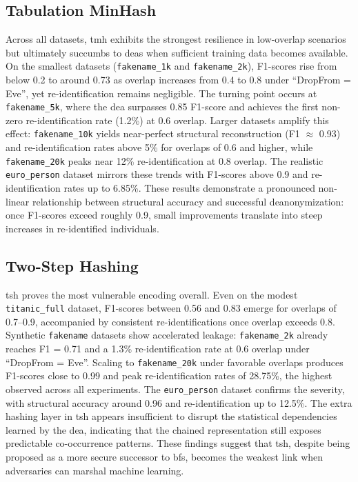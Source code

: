 \documentclass[a4paper,11pt]{scrartcl}
\begin{document}
\subsection{Tabulation MinHash}
Across all datasets, \ac{tmh} exhibits the strongest resilience in low-overlap scenarios but ultimately succumbs to \ac{dea}s when sufficient training data becomes available. On the smallest datasets (\texttt{fakename\_1k} and \texttt{fakename\_2k}), F1-scores rise from below 0.2 to around 0.73 as overlap increases from 0.4 to 0.8 under ``DropFrom = Eve'', yet re-identification remains negligible. The turning point occurs at \texttt{fakename\_5k}, where the \ac{dea} surpasses 0.85 F1-score and achieves the first non-zero re-identification rate (1.2\%) at 0.6 overlap. Larger datasets amplify this effect: \texttt{fakename\_10k} yields near-perfect structural reconstruction (F1 $\approx$ 0.93) and re-identification rates above 5\% for overlaps of 0.6 and higher, while \texttt{fakename\_20k} peaks near 12\% re-identification at 0.8 overlap. The realistic \texttt{euro\_person} dataset mirrors these trends with F1-scores above 0.9 and re-identification rates up to 6.85\%. These results demonstrate a pronounced non-linear relationship between structural accuracy and successful deanonymization: once F1-scores exceed roughly 0.9, small improvements translate into steep increases in re-identified individuals.

\subsection{Two-Step Hashing}
\ac{tsh} proves the most vulnerable encoding overall. Even on the modest \texttt{titanic\_full} dataset, F1-scores between 0.56 and 0.83 emerge for overlaps of 0.7--0.9, accompanied by consistent re-identifications once overlap exceeds 0.8. Synthetic \texttt{fakename} datasets show accelerated leakage: \texttt{fakename\_2k} already reaches F1 = 0.71 and a 1.3\% re-identification rate at 0.6 overlap under ``DropFrom = Eve''. Scaling to \texttt{fakename\_20k} under favorable overlaps produces F1-scores close to 0.99 and peak re-identification rates of 28.75\%, the highest observed across all experiments. The \texttt{euro\_person} dataset confirms the severity, with structural accuracy around 0.96 and re-identification up to 12.5\%. The extra hashing layer in \ac{tsh} appears insufficient to disrupt the statistical dependencies learned by the \ac{dea}, indicating that the chained representation still exposes predictable co-occurrence patterns. These findings suggest that \ac{tsh}, despite being proposed as a more secure successor to \ac{bf}s, becomes the weakest link when adversaries can marshal machine learning.
\end{document}
